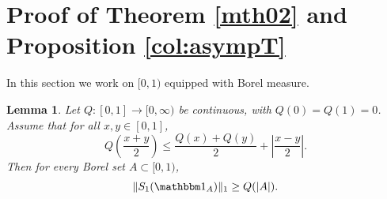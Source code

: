 \documentclass[11pt]{amsart}
\newtheorem{lemma}[theorem]{Lemma}
\theoremstyle{definition}
\renewcommand{\1}{{\mathbbm{1}}}
\begin{document}
\section{Proof of Theorem \ref{mth02} and Proposition \ref{col:asympT}} 

In this section we work on {$[0,1)$} equipped with Borel measure. 


\begin{lemma}\label{lem:Bellman-lower-11}
Let $Q:[0,1]\to [0,\infty)$ be continuous, with $Q(0)=Q(1)=0$. Assume that
for all $x,y\in[0,1]$,
\begin{equation}\label{eq:Q-twopoint-11}
Q\!\left(\frac{x+y}{2}\right)
\le
\frac{Q(x)+Q(y)}{2}
+
\left|\frac{x-y}{2}\right|.
\end{equation}
Then for every Borel set $A\subset{[0,1)}$,
\[
\|S_1(\mathbbm 1_A)\|_1 \ge Q(|A|).
\]
\end{lemma}
\end{document}
